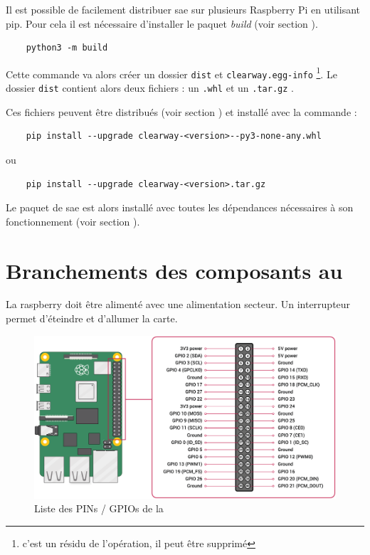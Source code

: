 Il est possible de facilement distribuer \gls{sae} sur plusieurs Raspberry Pi en utilisant \gls{pip}. Pour
cela il est nécessaire d'installer le \gls{paquet} \textit{build} (voir section ).

\begin{verbatim}
    python3 -m build
\end{verbatim}

Cette commande va alors créer un dossier \texttt{dist} et \texttt{clearway.egg-info}
\footnote{c'est un résidu de l'opération, il  peut être supprimé}. Le dossier \texttt{dist} contient
alors deux fichiers : un \texttt{.whl} et un \texttt{.tar.gz} \nocite{wheel}\nocite{setuptools}.\newline

Ces fichiers peuvent être distribués (voir section ) et installé avec la commande :

\begin{verbatim}
    pip install --upgrade clearway-<version>--py3-none-any.whl
\end{verbatim}

ou

\begin{verbatim}
    pip install --upgrade clearway-<version>.tar.gz
\end{verbatim}

Le \gls{paquet} de \gls{sae} est alors installé avec toutes les dépendances nécessaires à son fonctionnement (voir
section ).

\newpage
\section{Branchements des composants au }

La \gls{raspberry} doit être alimenté avec une alimentation secteur. Un interrupteur permet d'éteindre et d'allumer la carte.

\begin{figure}[H]
    \centering
    \includegraphics[width=\textwidth]{img/Rpi4_pin.png}
    \caption{Liste des PINs / GPIOs de la }
\end{figure}

